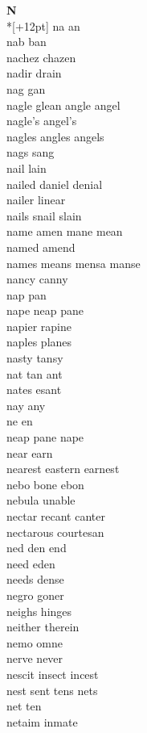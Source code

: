 \vspace{14pt}
\noindent\textbf{\Large N}\\*[+12pt]
na an\\
nab ban\\
nachez chazen\\
nadir drain\\
nag gan\\
nagle glean angle angel\\
nagle's angel's\\
nagles angles angels\\
nags sang\\
nail lain\\
nailed daniel denial\\
nailer linear\\
nails snail slain\\
name amen mane mean\\
named amend\\
names means mensa manse\\
nancy canny\\
nap pan\\
nape neap pane\\
napier rapine\\
naples planes\\
nasty tansy\\
nat tan ant\\
nates esant\\
nay any\\
ne en\\
neap pane nape\\
near earn\\
nearest eastern earnest\\
nebo bone ebon\\
nebula unable\\
nectar recant canter\\
nectarous courtesan\\
ned den end\\
need eden\\
needs dense\\
negro goner\\
neighs hinges\\
neither therein\\
nemo omne\\
nerve never\\
nescit insect incest\\
nest sent tens nets\\
net ten\\
netaim inmate\\
